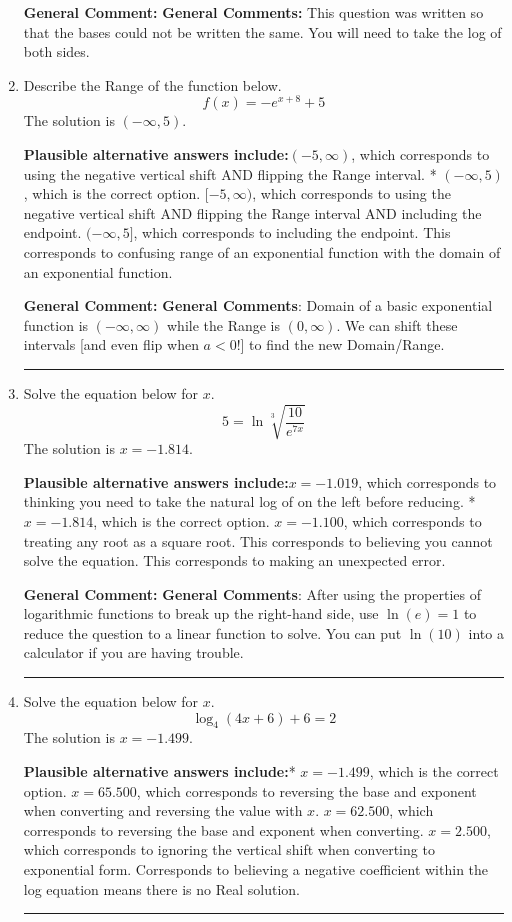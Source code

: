 \documentclass{extbook}[14pt]
\newcommand{\litem}[1]{\item #1

\rule{\textwidth}{0.4pt}}
\begin{document}
\begin{enumerate}
{\textbf{General Comment:} \textbf{General Comments:} This question was written so that the bases could not be written the same. You will need to take the log of both sides.
}
\litem{
Describe the Range of the function below.
\[ f(x) = -e^{x+8}+5 \]The solution is \( (-\infty, 5) \).\begin{enumerate}[label=\Alph*.]
\textbf{Plausible alternative answers include:}$(-5, \infty)$, which corresponds to using the negative vertical shift AND flipping the Range interval.
* $(-\infty, 5)$, which is the correct option.
$[-5, \infty)$, which corresponds to using the negative vertical shift AND flipping the Range interval AND including the endpoint.
$(-\infty, 5]$, which corresponds to including the endpoint.
This corresponds to confusing range of an exponential function with the domain of an exponential function.
\end{enumerate}

\textbf{General Comment:} \textbf{General Comments}: Domain of a basic exponential function is $(-\infty, \infty)$ while the Range is $(0, \infty)$. We can shift these intervals [and even flip when $a<0$!] to find the new Domain/Range.
}
\litem{
Solve the equation below for $x$.
\[  5 = \ln{\sqrt[3]{\frac{10}{e^{7x}}}} \]The solution is \( x = -1.814 \).\begin{enumerate}[label=\Alph*.]
\textbf{Plausible alternative answers include:}$x = -1.019$, which corresponds to thinking you need to take the natural log of on the left before reducing.
* $x = -1.814$, which is the correct option.
$x = -1.100$, which corresponds to treating any root as a square root.
This corresponds to believing you cannot solve the equation.
This corresponds to making an unexpected error.
\end{enumerate}

\textbf{General Comment:} \textbf{General Comments}: After using the properties of logarithmic functions to break up the right-hand side, use $\ln(e) = 1$ to reduce the question to a linear function to solve. You can put $\ln(10)$ into a calculator if you are having trouble.
}
\litem{
Solve the equation below for $x$.
\[ \log_{4}{(4x+6)}+6 = 2 \]The solution is \( x = -1.499 \).\begin{enumerate}[label=\Alph*.]
\textbf{Plausible alternative answers include:}* $x = -1.499$, which is the correct option.
$x = 65.500$, which corresponds to reversing the base and exponent when converting and reversing the value with $x$.
$x = 62.500$, which corresponds to reversing the base and exponent when converting.
$x = 2.500$, which corresponds to ignoring the vertical shift when converting to exponential form.
Corresponds to believing a negative coefficient within the log equation means there is no Real solution.
\end{enumerate}

}
\end{enumerate}
\end{document}
